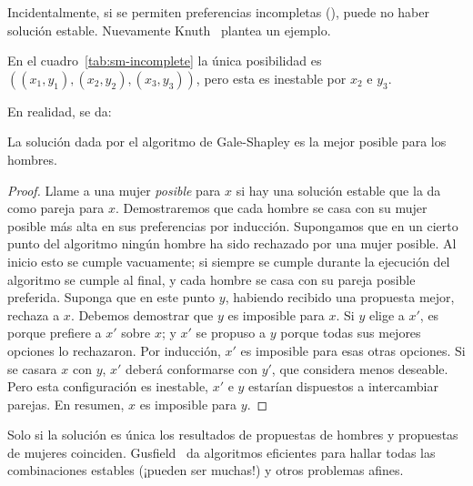   Incidentalmente,
  si se permiten preferencias incompletas
  (),
  puede no haber solución estable.
  Nuevamente Knuth~%
    \cite{knuth96:_stable_marriage}
  plantea un ejemplo.
  \begin{table}[ht]
    \centering
    \hspace*{3em}
    \caption{Preferencias incompletas}
    \label{tab:sm-incomplete}
  \end{table}
  En el cuadro~\ref{tab:sm-incomplete} la única posibilidad es
  \(((x_1, y_1), (x_2, y_2), (x_3, y_3))\),
  pero esta es inestable por \(x_2\) e \(y_3\).

  En realidad,
  se da:
  \begin{theorem}
    \label{theo:sm-optimal}
    La solución dada por el algoritmo de Gale-Shapley
    es la mejor posible para los hombres.
  \end{theorem}
  \begin{proof}
    Llame a una mujer \emph{posible} para \(x\)
    si hay una solución estable que la da como pareja para \(x\).
    Demostraremos que cada hombre se casa
    con su mujer posible más alta en sus preferencias
    por inducción.
    Supongamos que en un cierto punto del algoritmo
    ningún hombre ha sido rechazado por una mujer posible.
    Al inicio esto se cumple vacuamente;
    si siempre se cumple durante la ejecución del algoritmo
    se cumple al final,
    y cada hombre se casa con su pareja posible preferida.
    Suponga que en este punto \(y\),
    habiendo recibido una propuesta mejor,
    rechaza a \(x\).
    Debemos demostrar que \(y\) es imposible para \(x\).
    Si \(y\) elige a \(x'\),
    es porque prefiere a \(x'\) sobre \(x\);
    y \(x'\) se propuso a \(y\) porque todas sus mejores opciones
    lo rechazaron.
    Por inducción,
    \(x'\) es imposible para esas otras opciones.
    Si se casara \(x\) con \(y\),
    \(x'\) deberá conformarse con \(y'\),
    que considera menos deseable.
    Pero esta configuración es inestable,
    \(x'\) e \(y\) estarían dispuestos a intercambiar parejas.
    En resumen,
    \(x\) es imposible para \(y\).
  \end{proof}
  Solo si la solución es única
  los resultados de propuestas de hombres y propuestas de mujeres coinciden.
  Gusfield~%
    \cite{gusfield87:_three_fast_algor_four_probl_stabl_marriag}
  da algoritmos eficientes para hallar todas las combinaciones estables
  (¡pueden ser muchas!)
  y otros problemas afines.

